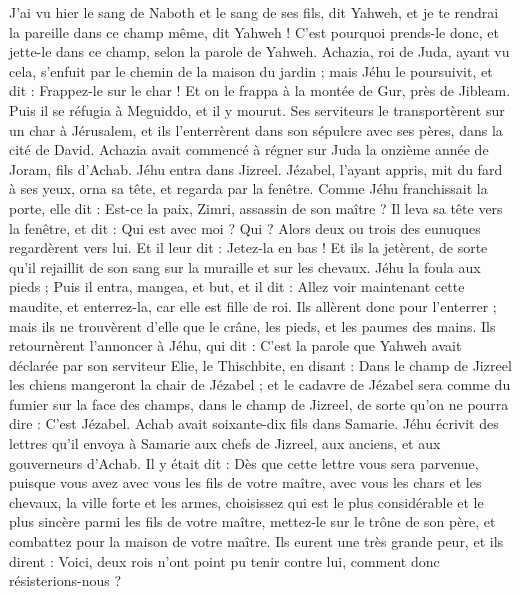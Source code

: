\begin{multicols}{2}
J’ai vu hier le sang de Naboth et le sang de ses fils, dit Yahweh, et je te rendrai la pareille dans ce champ même, dit Yahweh ! C’est pourquoi prends-le donc, et jette-le dans ce champ, selon la parole de Yahweh.
Achazia, roi de Juda, ayant vu cela, s’enfuit par le chemin de la maison du jardin ; mais Jéhu le poursuivit, et dit : Frappez-le sur le char ! Et on le frappa à la montée de Gur, près de Jibleam. Puis il se réfugia à Meguiddo, et il y mourut.
Ses serviteurs le transportèrent sur un char à Jérusalem, et ils l’enterrèrent dans son sépulcre avec ses pères, dans la cité de David.
Achazia avait commencé à régner sur Juda la onzième année de Joram, fils d’Achab.
Jéhu entra dans Jizreel. Jézabel, l’ayant appris, mit du fard à ses yeux, orna sa tête, et regarda par la fenêtre.
Comme Jéhu franchissait la porte, elle dit : Est-ce la paix, Zimri, assassin de son maître ?
Il leva sa tête vers la fenêtre, et dit : Qui est avec moi ? Qui ? Alors deux ou trois des eunuques regardèrent vers lui.
Et il leur dit : Jetez-la en bas ! Et ils la jetèrent, de sorte qu’il rejaillit de son sang sur la muraille et sur les chevaux. Jéhu la foula aux pieds ;
Puis il entra, mangea, et but, et il dit : Allez voir maintenant cette maudite, et enterrez-la, car elle est fille de roi.
Ils allèrent donc pour l’enterrer ; mais ils ne trouvèrent d’elle que le crâne, les pieds, et les paumes des mains.
Ils retournèrent l’annoncer à Jéhu, qui dit : C’est la parole que Yahweh avait déclarée par son serviteur Elie, le Thischbite, en disant : Dans le champ de Jizreel les chiens mangeront la chair de Jézabel ;
et le cadavre de Jézabel sera comme du fumier sur la face des champs, dans le champ de Jizreel, de sorte qu’on ne pourra dire : C’est Jézabel.
\VerseOne{}Achab avait soixante-dix fils dans Samarie. Jéhu écrivit des lettres qu’il envoya à Samarie aux chefs de Jizreel, aux anciens, et aux gouverneurs d’Achab. Il y était dit :
Dès que cette lettre vous sera parvenue, puisque vous avez avec vous les fils de votre maître, avec vous les chars et les chevaux, la ville forte et les armes,
choisissez qui est le plus considérable et le plus sincère parmi les fils de votre maître, mettez-le sur le trône de son père, et combattez pour la maison de votre maître.
Ils eurent une très grande peur, et ils dirent : Voici, deux rois n’ont point pu tenir contre lui, comment donc résisterions-nous ?

\end{multicols}
